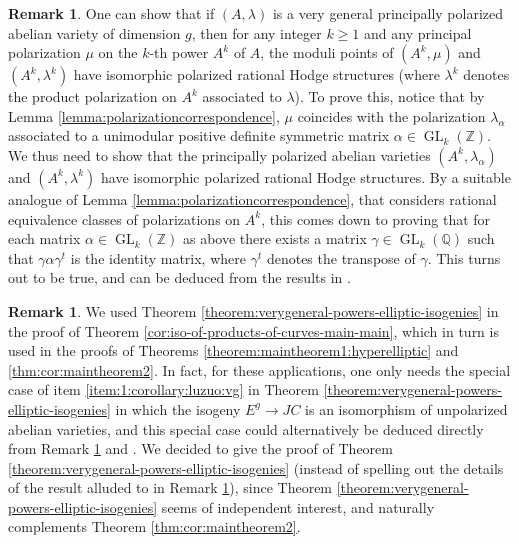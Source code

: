 \documentclass[a4paper,11pt,reqno]{amsart}
\numberwithin{equation}{section}
\theoremstyle{plain}
\theoremstyle{definition}
\newtheorem{remark}[theorem]{Remark}
\newcommand{\Z}{\mathbb Z}
\newcommand{\Q}{\mathbb Q}
\newcommand{\GL}{\operatorname{GL}}
\begin{document}
\begin{remark} \label{rem:Hecke-orbit-A^k}
One can show that if $(A,\lambda)$ is a very general principally polarized abelian variety of dimension $g$, then for any integer $k \geq 1$ and any principal polarization $\mu$ on the $k$-th power $A^k$ of $A$, the moduli points of $(A^k, \mu)$ and $(A^k, \lambda^k)$ have isomorphic polarized
rational Hodge structures
(where $\lambda^k$ denotes the product polarization on $A^k$ associated to $\lambda$). 
To prove this, notice that by Lemma \ref{lemma:polarizationcorrespondence}, $\mu $ coincides with the polarization $\lambda_\alpha$ associated to a unimodular positive definite symmetric matrix $\alpha \in \GL_k(\Z)$. 
We thus need to show that the principally polarized abelian varieties $(A^k, \lambda_\alpha)$ and $(A^k, \lambda^k)$ have isomorphic polarized
rational Hodge structures. 
By a suitable analogue of Lemma \ref{lemma:polarizationcorrespondence}, that considers rational equivalence classes of polarizations on $A^k$, this comes down to proving that for each matrix $\alpha \in \GL_k(\Z)$ as above there exists a matrix $\gamma \in \GL_k(\Q)$ such that 
$\gamma \alpha \gamma^t$ is the identity matrix, where $\gamma^t$ denotes the transpose of $\gamma$. 
This turns out to be true, and can be deduced from the results in \cite[Chapter V, Sections 1.3.5 and 1.3.6]{serre-course-in-arithmetic}.
\end{remark}

\begin{remark}
We used Theorem \ref{theorem:verygeneral-powers-elliptic-isogenies} in the proof of Theorem \ref{cor:iso-of-products-of-curves-main-main}, which in turn is used in the proofs of Theorems \ref{theorem:maintheorem1:hyperelliptic} and \ref{thm:cor:maintheorem2}.
In fact, for these applications, one only needs the special case of item \eqref{item:1:corollary:luzuo:vg} in Theorem \ref{theorem:verygeneral-powers-elliptic-isogenies} in which the isogeny $E^g\to JC$ is an isomorphism of unpolarized abelian varieties, and this special case could alternatively be deduced directly from Remark \ref{rem:Hecke-orbit-A^k} and \cite[Theorem A]{luzuo-shimuracurves}. 
We decided to give the proof of Theorem \ref{theorem:verygeneral-powers-elliptic-isogenies} (instead of spelling out the details of the result alluded to in Remark \ref{rem:Hecke-orbit-A^k}), since Theorem \ref{theorem:verygeneral-powers-elliptic-isogenies} seems of independent interest, and naturally complements Theorem \ref{thm:cor:maintheorem2}.
\end{remark}
\end{document}

